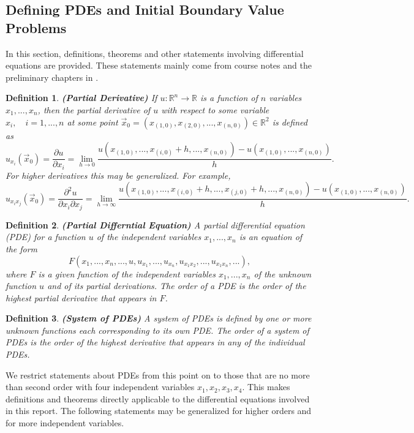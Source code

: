 \documentclass[12pt]{article}
\newtheorem{definition}{Definition}[section]
\theoremstyle{definition}
\numberwithin{equation}{section}
\begin{document}
{\subsection{Defining PDEs and Initial Boundary Value Problems}
\label{DEs}
In this section, definitions, theorems and other statements involving differential equations are provided. These statements mainly come from course notes and the preliminary chapters in \cite{Codd}.
\begin{definition}\textbf{(Partial Derivative)}
If $u:\mathbb{R}^n\rightarrow\mathbb{R}$ is a function of $n$ variables $x_1,...,x_n$, then the partial derivative of $u$ with respect to some variable $x_i,\quad i=1,...,n$ at some point $\vec{x}_0=(x_{(1,0)},x_{(2,0)},...,x_{(n,0)})\in\mathbb{R}^2$ is defined as 
$$u_{x_i}(\vec{x}_0)=\frac{\partial u}{\partial x_i}=\lim_{h\rightarrow 0}\frac{u(x_{(1,0)},...,x_{(i,0)}+h,...,x_{(n,0)})-u(x_{(1,0)},...,x_{(n,0)})}{h}.$$
For higher derivatives this may be generalized. For example,
$$u_{x_ix_j}(\vec{x}_0)=\frac{\partial^2u}{\partial x_i\partial x_j}=\lim_{h\rightarrow\infty}\frac{u(x_{(1,0)},...,x_{(i,0)}+h,...,x_{(j,0)}+h,...,x_{(n,0)})-u(x_{(1,0)},...,x_{(n,0)})}{h}.$$
\end{definition}
\begin{definition}\textbf{(Partial Differntial Equation)}
A partial differential equation (PDE) for a function $u$ of the independent variables $x_1,...,x_n$ is an equation of the form
$$F(x_1,...,x_n,...,u,u_{x_1},...,u_{x_n},u_{x_1x_2},...,u_{x_1x_n},...),$$
where $F$ is a given function of the independent variables $x_1,...,x_n$ of the unknown function $u$ and of its partial derivations. The {\it order} of a PDE is the order of the highest partial derivative that appears in $F$.
\end{definition}
\begin{definition}\textbf{(System of PDEs)}
A system of PDEs is defined by one or more unknown functions each corresponding to its own PDE. The order of a system of PDEs is the order of the highest derivative that appears in any of the individual PDEs.
\end{definition}

We restrict statements about PDEs from this point on to those that are no more than second order with four independent variables $x_1,x_2,x_3,x_4$. This makes definitions and theorems directly applicable to the differential equations involved in this report. The following statements may be generalized for higher orders and for more independent variables.

}
\end{document}
